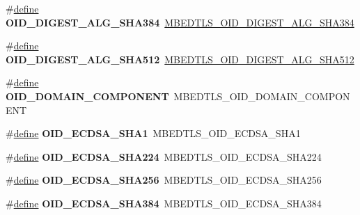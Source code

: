 \begin{DoxyCompactItemize}
\#\hyperlink{structdefine}{define} {\bfseries O\+I\+D\+\_\+\+D\+I\+G\+E\+S\+T\+\_\+\+A\+L\+G\+\_\+\+S\+H\+A384}~\hyperlink{oid_8h_a009bb4ed3a37a07ac3b56e4e7368c33d}{M\+B\+E\+D\+T\+L\+S\+\_\+\+O\+I\+D\+\_\+\+D\+I\+G\+E\+S\+T\+\_\+\+A\+L\+G\+\_\+\+S\+H\+A384}
\item 
\mbox{\label{compat-1_83_8h_a2aba5bb309a10445a58918288a84c27c}} 
\#\hyperlink{structdefine}{define} {\bfseries O\+I\+D\+\_\+\+D\+I\+G\+E\+S\+T\+\_\+\+A\+L\+G\+\_\+\+S\+H\+A512}~\hyperlink{oid_8h_a49a6e10222d13db7f7a88dfc42b6a036}{M\+B\+E\+D\+T\+L\+S\+\_\+\+O\+I\+D\+\_\+\+D\+I\+G\+E\+S\+T\+\_\+\+A\+L\+G\+\_\+\+S\+H\+A512}
\item 
\mbox{\label{compat-1_83_8h_a7cf4314fd28bd9af854b40472f0274aa}} 
\#\hyperlink{structdefine}{define} {\bfseries O\+I\+D\+\_\+\+D\+O\+M\+A\+I\+N\+\_\+\+C\+O\+M\+P\+O\+N\+E\+NT}~M\+B\+E\+D\+T\+L\+S\+\_\+\+O\+I\+D\+\_\+\+D\+O\+M\+A\+I\+N\+\_\+\+C\+O\+M\+P\+O\+N\+E\+NT
\item 
\mbox{\label{compat-1_83_8h_a10978a47054b2195610dd78e9c53456b}} 
\#\hyperlink{structdefine}{define} {\bfseries O\+I\+D\+\_\+\+E\+C\+D\+S\+A\+\_\+\+S\+H\+A1}~M\+B\+E\+D\+T\+L\+S\+\_\+\+O\+I\+D\+\_\+\+E\+C\+D\+S\+A\+\_\+\+S\+H\+A1
\item 
\mbox{\label{compat-1_83_8h_a8736f5772bb26c34b330f843125c7a4e}} 
\#\hyperlink{structdefine}{define} {\bfseries O\+I\+D\+\_\+\+E\+C\+D\+S\+A\+\_\+\+S\+H\+A224}~M\+B\+E\+D\+T\+L\+S\+\_\+\+O\+I\+D\+\_\+\+E\+C\+D\+S\+A\+\_\+\+S\+H\+A224
\item 
\mbox{\label{compat-1_83_8h_a4dd31591f3c1c6d6e713fb0d282a632a}} 
\#\hyperlink{structdefine}{define} {\bfseries O\+I\+D\+\_\+\+E\+C\+D\+S\+A\+\_\+\+S\+H\+A256}~M\+B\+E\+D\+T\+L\+S\+\_\+\+O\+I\+D\+\_\+\+E\+C\+D\+S\+A\+\_\+\+S\+H\+A256
\item 
\mbox{\label{compat-1_83_8h_ae1e3cf7185bd331021e9f083dff9d5b0}} 
\#\hyperlink{structdefine}{define} {\bfseries O\+I\+D\+\_\+\+E\+C\+D\+S\+A\+\_\+\+S\+H\+A384}~M\+B\+E\+D\+T\+L\+S\+\_\+\+O\+I\+D\+\_\+\+E\+C\+D\+S\+A\+\_\+\+S\+H\+A384
\item 
\mbox{\label{compat-1_83_8h_a5e90856601283b52383de08aea953e9e}} 

\end{DoxyCompactItemize}
